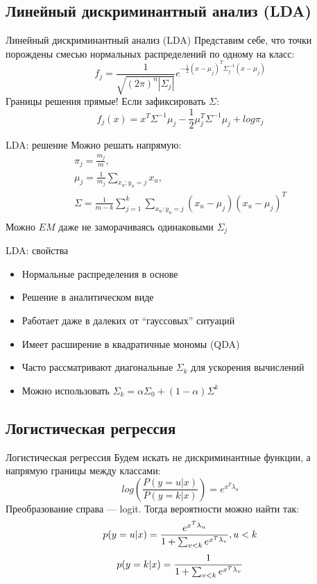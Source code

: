 \documentclass[14pt, fleqn, xcolor={dvipsnames, table}]{beamer}
\begin{document}
\subsection{Линейный дискриминантный анализ (LDA)}
\begin{frame}{Линейный дискриминантный анализ (LDA)}
Представим себе, что точки порождены смесью нормальных распределений по одному на класс:
$$
f_j = \frac{1}{\sqrt{(2\pi)^n|\Sigma_j|}}e^{-\frac{1}{2}(x - \mu_j)^T\Sigma^{-1}_j(x - \mu_j)}
$$
Границы решения прямые! Если зафиксировать $\Sigma$:
$$
f_j(x) = x^T\Sigma^{-1}\mu_j - \frac{1}{2}\mu_j^T\Sigma^{-1}\mu_j + log \pi_j
$$
\end{frame}
\begin{frame}{LDA: решение}
Можно решать напрямую:
$$\begin{array}{c}
\pi_j = \frac{m_j}{m},\\
\mu_j = \frac{1}{m_j}\sum_{x_u:y_u = j} x_u,\\
\Sigma = \frac{1}{m-k}\sum_{j=1}^k\sum_{x_u:y_u = j}(x_u - \mu_j)(x_u - \mu_j)^T \\
\end{array}$$
Можно $EM$ даже не заморачиваясь одинаковыми $\Sigma_j$
\end{frame}
\begin{frame}{LDA: свойства}
\begin{itemize}
  \item Нормальные распределения в основе
  \item Решение в аналитическом виде
  \item Работает даже в далеких от ``гауссовых'' ситуаций
  \item Имеет расширение в квадратичные мономы (QDA)
  \item Часто рассматривают диагональные $\Sigma_k$ для ускорения вычислений
  \item Можно использовать $\Sigma_k = \alpha\Sigma_0 + (1 - \alpha)\Sigma^k$
\end{itemize}
\end{frame}

\subsection{Логистическая регрессия}

\begin{frame}{Логистическая регрессия}
Будем искать не дискриминантные функции, а напрямую границы между классами:
$$
log\left(\frac{P(y=u|x)}{P(y=k|x)}\right) = e^{x^T \lambda_{u}}
$$
Преобразование справа --- logit. Тогда вероятности можно найти так:
$$
p(y=u|x) = {e^{x^T \lambda_{u}} \over 1 + \sum_{v < k} e^{x^T\lambda_v}}, u < k
$$
$$
p(y=k|x) = {1 \over 1 + \sum_{v < k} e^{x^T\lambda_v}}
$$
\end{frame}
\end{document}
